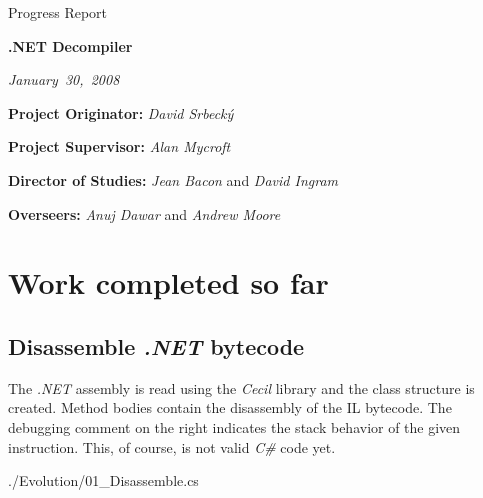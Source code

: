 \documentclass[12pt]{article}
\begin{document}
\thispagestyle{empty}

\medskip
{}
\medskip
{}

\vspace{0.675in}

\centerline{\large Progress Report}
\vspace{0.4in}
\centerline{\Large\bf .NET Decompiler}
\vspace{0.3in}
\centerline{\large\emph{January~30,~2008}}

\vspace{0.675in}

{\bf Project Originator:} \emph{David Srbeck\'y}

\vspace{0.1in}

{\bf Project Supervisor:} \emph{Alan Mycroft}

\vspace{0.1in}

{\bf Director of Studies:} \emph{Jean Bacon} and \emph{David Ingram}

\vspace{0.1in}

{\bf Overseers:} \emph{Anuj Dawar} and \emph{Andrew Moore}

\vspace{0.1in}

\vfil
\eject

\newcommand{\CS}{\emph{C\#} }


\section*{Work completed so far}
\subsection*{Disassemble \emph{.NET} bytecode}

The \emph{.NET} assembly is read using the \emph{Cecil} library
and the class structure is created.  Method bodies contain the 
disassembly of the IL bytecode.  The debugging comment on the 
right indicates the stack behavior of the given instruction.
This, of course, is not valid \CS code yet.


{./Evolution/01_Disassemble.cs}
\end{document}
